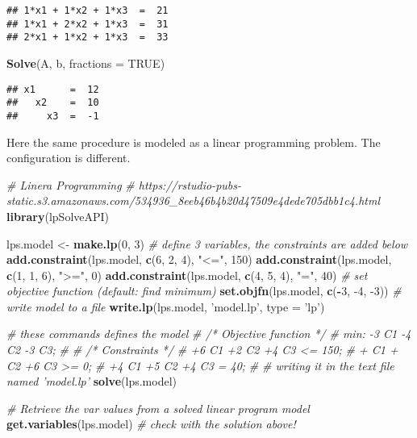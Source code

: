 \documentclass[]{article}
\newenvironment{Shaded}{\begin{snugshade}}{\end{snugshade}}
\newcommand{\CommentTok}[1]{\textcolor[rgb]{0.56,0.35,0.01}{\textit{#1}}}
\newcommand{\DataTypeTok}[1]{\textcolor[rgb]{0.13,0.29,0.53}{#1}}
\newcommand{\DecValTok}[1]{\textcolor[rgb]{0.00,0.00,0.81}{#1}}
\newcommand{\KeywordTok}[1]{\textcolor[rgb]{0.13,0.29,0.53}{\textbf{#1}}}
\newcommand{\NormalTok}[1]{#1}
\newcommand{\OperatorTok}[1]{\textcolor[rgb]{0.81,0.36,0.00}{\textbf{#1}}}
\newcommand{\OtherTok}[1]{\textcolor[rgb]{0.56,0.35,0.01}{#1}}
\newcommand{\StringTok}[1]{\textcolor[rgb]{0.31,0.60,0.02}{#1}}
\begin{document}
\begin{verbatim}
## 1*x1 + 1*x2 + 1*x3  =  21 
## 1*x1 + 2*x2 + 1*x3  =  31 
## 2*x1 + 1*x2 + 1*x3  =  33
\end{verbatim}

\begin{Shaded}
\begin{Highlighting}[]
\KeywordTok{Solve}\NormalTok{(A, b, }\DataTypeTok{fractions =} \OtherTok{TRUE}\NormalTok{)}
\end{Highlighting}
\end{Shaded}

\begin{verbatim}
## x1      =  12 
##   x2    =  10 
##     x3  =  -1
\end{verbatim}

Here the same procedure is modeled as a linear programming problem. The configuration is different.

\begin{Shaded}
\begin{Highlighting}[]
\CommentTok{# Linera Programming}
\CommentTok{# https://rstudio-pubs-static.s3.amazonaws.com/534936_8eeb46b4b20d47509e4dede705dbb1c4.html}
\KeywordTok{library}\NormalTok{(lpSolveAPI)}

\NormalTok{lps.model <-}\StringTok{ }\KeywordTok{make.lp}\NormalTok{(}\DecValTok{0}\NormalTok{, }\DecValTok{3}\NormalTok{) }\CommentTok{# define 3 variables, the constraints are added below}
\KeywordTok{add.constraint}\NormalTok{(lps.model, }\KeywordTok{c}\NormalTok{(}\DecValTok{6}\NormalTok{, }\DecValTok{2}\NormalTok{, }\DecValTok{4}\NormalTok{), }\StringTok{"<="}\NormalTok{, }\DecValTok{150}\NormalTok{)}
\KeywordTok{add.constraint}\NormalTok{(lps.model, }\KeywordTok{c}\NormalTok{(}\DecValTok{1}\NormalTok{, }\DecValTok{1}\NormalTok{, }\DecValTok{6}\NormalTok{), }\StringTok{">="}\NormalTok{, }\DecValTok{0}\NormalTok{)}
\KeywordTok{add.constraint}\NormalTok{(lps.model, }\KeywordTok{c}\NormalTok{(}\DecValTok{4}\NormalTok{, }\DecValTok{5}\NormalTok{, }\DecValTok{4}\NormalTok{), }\StringTok{"="}\NormalTok{, }\DecValTok{40}\NormalTok{)}
\CommentTok{# set objective function (default: find minimum)}
\KeywordTok{set.objfn}\NormalTok{(lps.model, }\KeywordTok{c}\NormalTok{(}\OperatorTok{-}\DecValTok{3}\NormalTok{, }\DecValTok{-4}\NormalTok{, }\DecValTok{-3}\NormalTok{))}
\CommentTok{# write model to a file}
\KeywordTok{write.lp}\NormalTok{(lps.model, }\StringTok{'model.lp'}\NormalTok{, }\DataTypeTok{type =} \StringTok{'lp'}\NormalTok{)}

\CommentTok{# these commands defines the model}
\CommentTok{# /* Objective function */}
\CommentTok{#   min: -3 C1 -4 C2 -3 C3;}
\CommentTok{#}
\CommentTok{# /* Constraints */}
\CommentTok{# +6 C1 +2 C2 +4 C3 <= 150;}
\CommentTok{# +  C1 +  C2 +6 C3 >=   0;}
\CommentTok{# +4 C1 +5 C2 +4 C3  =  40;}
\CommentTok{#}
\CommentTok{# writing it in the text file named 'model.lp'}
\KeywordTok{solve}\NormalTok{(lps.model)}

\CommentTok{# Retrieve the var values from a solved linear program model}
\KeywordTok{get.variables}\NormalTok{(lps.model)  }\CommentTok{# check with the solution above!}
\end{Highlighting}
\end{Shaded}
\end{document}
